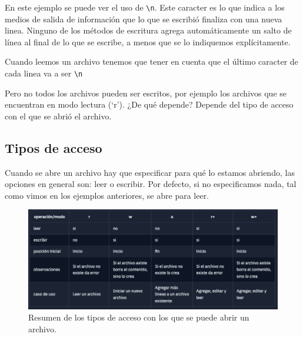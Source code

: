 \documentclass[
  letterpaper,
  DIV=11,
  numbers=noendperiod]{scrreprt}
\begin{document}
\begin{tcolorbox}[enhanced jigsaw, bottomrule=.15mm, leftrule=.75mm, opacityback=0, colback=white, toprule=.15mm, bottomtitle=1mm, opacitybacktitle=0.6, rightrule=.15mm, left=2mm, arc=.35mm, coltitle=black, title=\textcolor{quarto-callout-tip-color}{\faLightbulb}\hspace{0.5em}{Tip}, breakable, toptitle=1mm, colframe=quarto-callout-tip-color-frame, titlerule=0mm, colbacktitle=quarto-callout-tip-color!10!white]

En este ejemplo se puede ver el uso de \texttt{\textbackslash{}n}. Este
caracter es lo que indica a los medios de salida de información que lo
que se escribió finaliza con una nueva linea. Ninguno de los métodos de
escritura agrega automáticamente un salto de línea al final de lo que se
escribe, a menos que se lo indiquemos explícitamente.

Cuando leemos un archivo tenemos que tener en cuenta que el último
caracter de cada linea va a ser \texttt{\textbackslash{}n}

\end{tcolorbox}

Pero no todos los archivos pueden ser escritos, por ejemplo los archivos
que se encuentran en modo lectura (`r'). ¿De qué depende? Depende del
tipo de acceso con el que se abrió el archivo.

\subsection{Tipos de acceso}\label{tipos-de-acceso}

Cuando se abre un archivo hay que especificar para qué lo estamos
abriendo, las opciones en general son: leer o escribir. Por defecto, si
no especificamos nada, tal como vimos en los ejemplos anteriores, se
abre para leer.

\begin{figure}[H]

{\centering \includegraphics{./imgs/unidad_5/tipos_acceso.png}

}

\caption{Resumen de los tipos de acceso con los que se puede abrir un
archivo.}

\end{figure}%
\end{document}
